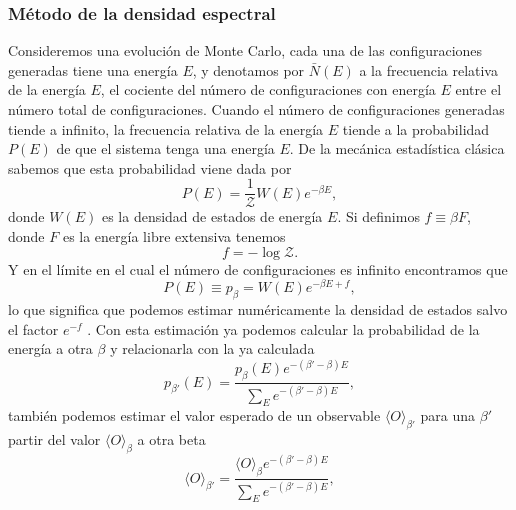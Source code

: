 \subsubsection{Método de la densidad espectral}\label{densidad_espectral-sec}

Consideremos una evolución de Monte Carlo, cada una de las configuraciones
generadas tiene una energía $E$, y denotamos por $\bar{N}(E)$ a la frecuencia
relativa de la energía $E$, el cociente del número de configuraciones con
energía $E$ entre el número total de configuraciones. Cuando el número de
configuraciones generadas tiende a infinito, la frecuencia relativa de la
energía $E$ tiende a la probabilidad $P(E)$ de que el sistema tenga una
energía $E$. De la mecánica estadística clásica sabemos que esta probabilidad
viene dada por
\begin{equation*}
P(E)=\frac{1}{\mathcal{Z}}W(E)e^{-\beta E},  
\end{equation*}
donde $W(E)$ es la densidad de estados de energía $E$. Si definimos $f\equiv
\beta F$, donde $F$ es la energía libre extensiva tenemos
\begin{equation*}
f=-\log \mathcal{Z}.
\end{equation*}
Y en el límite en el cual el número de configuraciones es infinito encontramos
que
\begin{equation}
P(E)\equiv p_{\beta}=W(E)e^{-\beta E+f} ,
\end{equation}
lo que significa que podemos estimar numéricamente la densidad de estados
salvo el factor $e^{-f}$ \cite{Juan:tesis}. Con esta estimación ya podemos calcular la
probabilidad de la energía a otra $\beta$ y relacionarla con la ya calculada
\begin{equation*}
p_{\beta'}(E)=\frac{p_{\beta}(E)e^{-(\beta'-\beta)E}}{\sum_E e^{-(\beta'-\beta)E}},
\end{equation*}
también podemos estimar el valor esperado de un observable $\langle
O\rangle_{\beta'}$  para una $\beta'$ partir del valor $\langle
O\rangle_{\beta}$ a otra beta
\begin{equation*}
\langle O\rangle_{\beta'}=\frac{\langle
O\rangle_{\beta} e^{-(\beta'-\beta)E}}{\sum_E e^{-(\beta'-\beta)E}},
\end{equation*}

